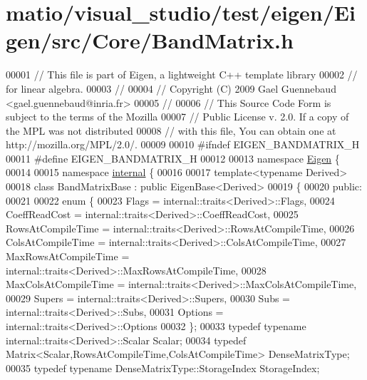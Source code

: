 \hypertarget{matio_2visual__studio_2test_2eigen_2_eigen_2src_2_core_2_band_matrix_8h_source}{}\section{matio/visual\+\_\+studio/test/eigen/\+Eigen/src/\+Core/\+Band\+Matrix.h}
\label{matio_2visual__studio_2test_2eigen_2_eigen_2src_2_core_2_band_matrix_8h_source}

\begin{DoxyCode}
00001 \textcolor{comment}{// This file is part of Eigen, a lightweight C++ template library}
00002 \textcolor{comment}{// for linear algebra.}
00003 \textcolor{comment}{//}
00004 \textcolor{comment}{// Copyright (C) 2009 Gael Guennebaud <gael.guennebaud@inria.fr>}
00005 \textcolor{comment}{//}
00006 \textcolor{comment}{// This Source Code Form is subject to the terms of the Mozilla}
00007 \textcolor{comment}{// Public License v. 2.0. If a copy of the MPL was not distributed}
00008 \textcolor{comment}{// with this file, You can obtain one at http://mozilla.org/MPL/2.0/.}
00009 
00010 \textcolor{preprocessor}{#ifndef EIGEN\_BANDMATRIX\_H}
00011 \textcolor{preprocessor}{#define EIGEN\_BANDMATRIX\_H}
00012 
00013 \textcolor{keyword}{namespace }\hyperlink{namespace_eigen}{Eigen} \{ 
00014 
00015 \textcolor{keyword}{namespace }\hyperlink{namespaceinternal}{internal} \{
00016 
00017 \textcolor{keyword}{template}<\textcolor{keyword}{typename} Derived>
00018 \textcolor{keyword}{class }BandMatrixBase : \textcolor{keyword}{public} EigenBase<Derived>
00019 \{
00020   \textcolor{keyword}{public}:
00021 
00022     \textcolor{keyword}{enum} \{
00023       Flags = internal::traits<Derived>::Flags,
00024       CoeffReadCost = internal::traits<Derived>::CoeffReadCost,
00025       RowsAtCompileTime = internal::traits<Derived>::RowsAtCompileTime,
00026       ColsAtCompileTime = internal::traits<Derived>::ColsAtCompileTime,
00027       MaxRowsAtCompileTime = internal::traits<Derived>::MaxRowsAtCompileTime,
00028       MaxColsAtCompileTime = internal::traits<Derived>::MaxColsAtCompileTime,
00029       Supers = internal::traits<Derived>::Supers,
00030       Subs   = internal::traits<Derived>::Subs,
00031       Options = internal::traits<Derived>::Options
00032     \};
00033     \textcolor{keyword}{typedef} \textcolor{keyword}{typename} internal::traits<Derived>::Scalar Scalar;
00034     \textcolor{keyword}{typedef} Matrix<Scalar,RowsAtCompileTime,ColsAtCompileTime> DenseMatrixType;
00035     \textcolor{keyword}{typedef} \textcolor{keyword}{typename} DenseMatrixType::StorageIndex StorageIndex;

\end{DoxyCode}
